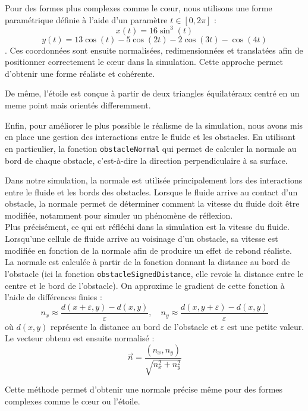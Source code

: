 \documentclass[a4paper]{article}
\begin{document}
Pour des formes plus complexes comme le cœur, nous utilisons une forme paramétrique définie à l'aide d'un paramètre  
$t \in [0, 2\pi]$ : \[ x(t) = 16 \sin^3(t) \] \[ y(t) = 13\cos(t) - 5\cos(2t) - 2\cos(3t) - \cos(4t) \] \cite{heartCurve}. 
Ces coordonnées sont ensuite normalisées, redimensionnées et translatées afin de positionner correctement le cœur dans la simulation. 
Cette approche permet d'obtenir une forme réaliste et cohérente.

De même, l'étoile est conçue à partir de deux triangles équilatéraux centré en un meme point mais orientés differemment.

Enfin, pour améliorer le plus possible le réalisme de la simulation, nous avons mis en place une gestion des interactions entre le fluide 
et les obstacles. 
En utilisant en particulier, la fonction \texttt{obstacleNormal} qui  permet de calculer la normale au bord de chaque obstacle, c'est-à-dire 
la direction perpendiculaire à sa surface. 


Dans notre simulation, la normale est utilisée principalement lors des interactions entre le fluide 
et les bords des obstacles. Lorsque le fluide arrive au contact d'un obstacle, la normale permet de 
déterminer comment la vitesse du fluide doit être modifiée, notamment pour simuler un phénomène de réflexion.\\

Plus précisément, ce qui est réfléchi dans la simulation est la vitesse du fluide. Lorsqu’une 
cellule de fluide arrive au voisinage d'un obstacle, sa vitesse est modifiée en fonction de la normale 
afin de produire un effet de rebond réaliste.\\

La normale est calculée à partir de la fonction donnant la distance au bord de l’obstacle 
(ici la fonction \texttt{obstacleSignedDistance}, elle revoie la distance entre le centre et le bord de l'obstacle). 
On approxime le gradient de cette fonction à l'aide de différences finies :
\[
n_x \approx \frac{d(x+\varepsilon, y) - d(x,y)}{\varepsilon}, \quad
n_y \approx \frac{d(x, y+\varepsilon) - d(x,y)}{\varepsilon}
\]
où $d(x,y)$ représente la distance au bord de l'obstacle et $\varepsilon$ est une petite valeur. 
Le vecteur obtenu est ensuite normalisé :
\[
\vec{n} = \frac{(n_x, n_y)}{\sqrt{n_x^2 + n_y^2}}
\]

Cette méthode permet d’obtenir une normale précise même pour des formes complexes comme le cœur 
ou l’étoile.\\
\end{document}

